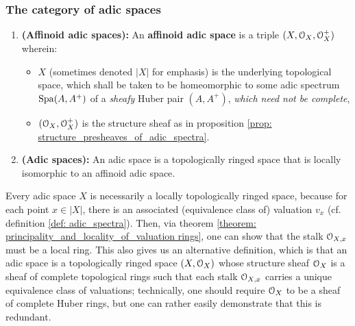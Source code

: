         \subsubsection{The category of adic spaces}
            \begin{definition} \label{def: adic_spaces}
                \noindent
                \begin{enumerate}
                    \item \textbf{(Affinoid adic spaces):} An \textbf{affinoid adic space} is a triple $(X, \mathcal{O}_X, \mathcal{O}_X^+)$ wherein:
                        \begin{itemize}
                            \item $X$ (sometimes denoted $|X|$ for emphasis) is the underlying topological space, which shall be taken to be homeomorphic to some adic spectrum $\mathrm{Spa}(A, A^+)$ of a \textit{sheafy} Huber pair $(A, A^+)$, \textit{which need not be complete},
                            \item $(\mathcal{O}_X, \mathcal{O}_X^+)$ is the structure sheaf as in proposition \ref{prop: structure_presheaves_of_adic_spectra}.
                        \end{itemize}
                    \item \textbf{(Adic spaces):} An adic space is a topologically ringed space that is locally isomorphic to an affinoid adic space.
                \end{enumerate}
            \end{definition}
            \begin{remark} \label{remark: adic_spaces_are_locally_ringed}
                Every adic space $X$ is necessarily a locally topologically ringed space, because for each point $x \in |X|$, there is an associated (equivalence class of) valuation $v_x$ (cf. definition \ref{def: adic_spectra}). Then, via theorem \ref{theorem: principality_and_locality_of_valuation rings}, one can show that the stalk $\mathcal{O}_{X, x}$ must be a local ring. This also gives us an alternative definition, which is that an adic space is a topologically ringed space $(X, \mathcal{O}_X)$ whose structure sheaf $\mathcal{O}_X$ is a sheaf of complete topological rings such that each stalk $\mathcal{O}_{X, x}$ carries a unique equivalence class of valuations; technically, one should require $\mathcal{O}_X$ to be a sheaf of complete Huber rings, but one can rather easily demonstrate that this is redundant. 
            \end{remark}
